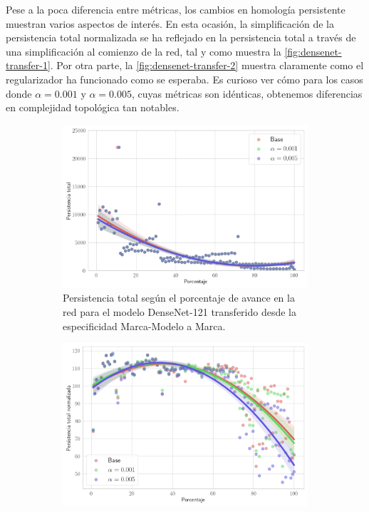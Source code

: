 Pese a la poca diferencia entre métricas, los cambios en homología persistente muestran
varios aspectos de interés. En esta ocasión, la simplificación de la persistencia
total normalizada se ha reflejado en la persistencia total a través de una simplificación
al comienzo de la red, tal y como muestra la \autoref{fig:densenet-transfer-1}. Por
otra parte, la \autoref{fig:densenet-transfer-2} muestra claramente como el
regularizador ha funcionado como se esperaba. Es curioso ver cómo para los casos
donde $\alpha = 0.001$ y $\alpha = 0.005$, cuyas métricas son idénticas, obtenemos
diferencias en complejidad topológica tan notables.

\begin{figure}[H]
	\centering
	\begin{subfigure}
		{.5\textwidth}
		\centering
		\includegraphics[width=\linewidth]{img/exp_transfer_densenet.png}
		\caption{Persistencia total según el porcentaje de avance en la red para el
			modelo DenseNet-121 transferido desde la especificidad Marca-Modelo a Marca.}
		\label{fig:densenet-transfer-1}
	\end{subfigure}%
	\begin{subfigure}
		{.5\textwidth}
		\centering
		\includegraphics[width=\linewidth]{img/exp_transfer_densenet_norm.png}

\end{subfigure}
\end{figure}
